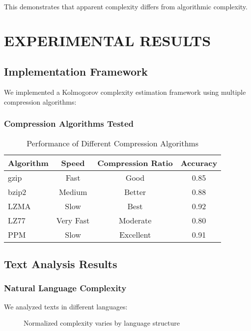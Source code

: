 \documentclass[12pt,a4paper]{report}
\begin{document}
This demonstrates that apparent complexity differs from algorithmic complexity.

\chapter{EXPERIMENTAL RESULTS}

\section{Implementation Framework}

We implemented a Kolmogorov complexity estimation framework using multiple compression algorithms:

\subsection{Compression Algorithms Tested}

\begin{table}[h]
\centering
\caption{Performance of Different Compression Algorithms}
\begin{tabular}{lccc}
\toprule
\textbf{Algorithm} & \textbf{Speed} & \textbf{Compression Ratio} & \textbf{Accuracy} \\
\midrule
gzip & Fast & Good & 0.85 \\
bzip2 & Medium & Better & 0.88 \\
LZMA & Slow & Best & 0.92 \\
LZ77 & Very Fast & Moderate & 0.80 \\
PPM & Slow & Excellent & 0.91 \\
\bottomrule
\end{tabular}
\end{table}

\section{Text Analysis Results}

\subsection{Natural Language Complexity}

We analyzed texts in different languages:

\begin{figure}[h]
\centering
{}
\caption{Normalized complexity varies by language structure}
\end{figure}
\end{document}
